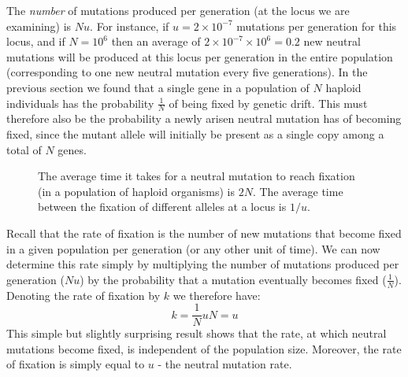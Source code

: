 \documentclass[11pt,a4paper]{book}
\newcommand{\e}{\emph}
\begin{document}
The \e{number} of mutations produced per generation (at the locus we are examining) is $Nu$. For instance, if $u=2\times 10^{-7}$ mutations per generation for this locus, and if $N=10^6$ then an average of $2\times 10^{-7} \times 10^6= 0.2$ new neutral mutations will be produced at this locus per generation in the entire population (corresponding to one new neutral mutation every five generations). In the previous section we found that a single gene in a population of $N$ haploid individuals has the probability $\frac{1}{N}$ of being fixed by genetic drift. This must therefore also be the probability a newly arisen neutral mutation has of becoming fixed, since the mutant allele will initially be present as a single copy among a total of $N$ genes.  


\begin{figure}[!t]
\begin{center}
\caption{The average time it takes for a neutral mutation  to reach fixation (in a population of haploid organisms) is $2N$. The average time between the fixation of different alleles at a locus is $1/u$.}
\label{FIGfixtime}
\end{center}
\end{figure} 

Recall that the rate of fixation is the number of new mutations that become fixed in a given population per generation (or any other unit of time). We can now determine this rate simply by multiplying the number of mutations produced per generation ($Nu$) by the probability that a mutation eventually becomes fixed ($\frac{1}{N}$). Denoting the rate of fixation by $k$ we therefore have:
%
\begin{equation}
k=\frac{1}{N}u N = u
\end{equation}
%
This simple but slightly surprising result shows that the rate, at which neutral mutations become fixed, is independent of the population size. Moreover, the rate of fixation is simply equal to $u$ - the neutral mutation rate. 
\end{document}
